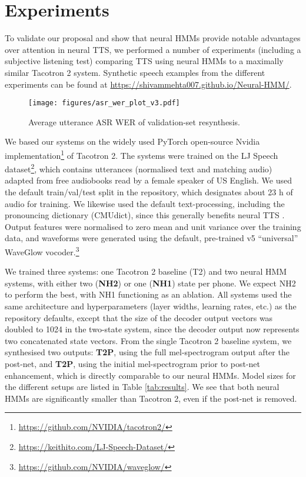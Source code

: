 \documentclass[british]{article}
\newcommand{\webpage}{https://shivammehta007.github.io/Neural-HMM/}
\newcommand{\tc}{T2}
\newcommand{\tcp}{T2P}
\newcommand{\tcnop}{T2P}
\newcommand{\nhtwo}{NH2}
\newcommand{\nhone}{NH1}
\begin{document}
\section{Experiments}
\label{sec:experiments}
To validate our proposal and show
that neural HMMs provide notable advantages over attention in neural TTS,
we performed a number of experiments (including a subjective listening test) comparing TTS using neural HMMs to a maximally similar Tacotron 2 \cite{shen2018natural} system.
Synthetic speech examples from the different experiments can be found at \href{\webpage}{\webpage}.
\begin{figure}[!t]
  \centering
  \texttt{[image: figures/asr\_wer\_plot\_v3.pdf]}\caption{Average utterance ASR WER of validation-set resynthesis.}
  \label{fig:wer}
  \vspace{-1\baselineskip}
\end{figure}

We based our systems on the widely used PyTorch
open-source Nvidia  implementation\footnote{\href{https://github.com/NVIDIA/tacotron2/}{https://github.com/NVIDIA/tacotron2/}} of Tacotron 2.
The systems were trained on the LJ Speech dataset\footnote{\href{https://keithito.com/LJ-Speech-Dataset/}{https://keithito.com/LJ-Speech-Dataset/}}, which contains utterances (normalised text and matching audio) adapted from free audiobooks read by a female speaker of US English.
We used the default train/val/test split in the repository, which designates
about 23 h of audio for training.
We likewise used the default text-processing, including the pronouncing dictionary (CMUdict), since this generally benefits neural TTS \cite{fong2019comparison}.
Output features were normalised to zero mean and unit variance over the training data, and waveforms were generated using the default, pre-trained v5 ``universal'' WaveGlow \cite{prenger2019waveglow} vocoder.\footnote{\href{https://github.com/NVIDIA/waveglow/}{https://github.com/NVIDIA/waveglow/}}


We trained three systems: one Tacotron 2 baseline (\tc{}) and two neural HMM systems, with either two (\textbf{\nhtwo{}}) or one (\textbf{\nhone{}}) state per phone.
We expect \nhtwo{} to perform the best, with \nhone{} functioning as an ablation.
All systems used the same architecture and hyperparameters (layer widths, learning rates, etc.) as the
repository defaults, except that the size of the decoder output vectors was doubled to 1024 in the two-state system, since the decoder output now represents two concatenated state vectors.
From the single Tacotron 2 baseline system, we synthesised two outputs:
\textbf{\tcp{}}, using the full mel-spectrogram output after the post-net, and \textbf{\tcnop{}}, using the initial mel-spectrogram prior to post-net enhancement, which is directly comparable to our neural HMMs.
Model sizes for the different setups are listed in Table \ref{tab:results}.
We see that both neural HMMs are significantly smaller than Tacotron 2, even if the post-net is removed.
\end{document}

